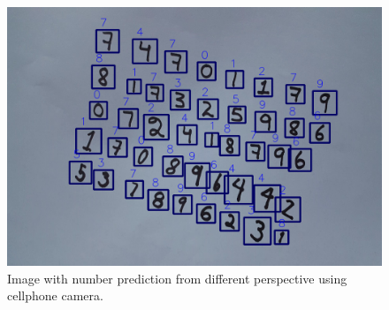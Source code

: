 \documentclass[12pt, letterpaper]{article}
\begin{document}
\begin{figure}[!h]
	\begin{center}
		\centering
		\includegraphics[width=0.75 \textwidth]{bbox_p3.png}
		\caption{Image with number prediction from different perspective using cellphone camera.}
		\label{fig:live3}
	\end{center}
\end{figure}



\newpage
\end{document}
